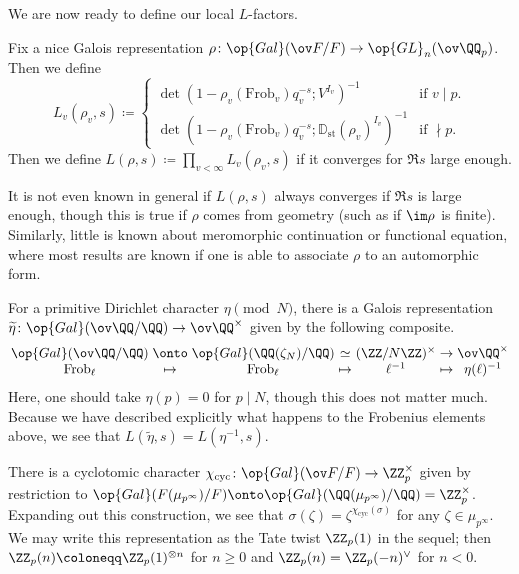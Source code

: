 \documentclass{article}
\begin{document}
We are now ready to define our local $L$-factors.
\begin{definition}
	Fix a nice Galois representation $\rho\colon\op{Gal}(\ov F/F)\to\op{GL}_n(\ov\QQ_p)$. Then we define
	\[L_v(\rho_v,s)\coloneqq\begin{cases}
		\det\left(1-\rho_v(\mathrm{Frob}_v)q_v^{-s};V^{I_v}\right)^{-1} & \text{if }v\mid p. \\
		\det\left(1-\rho_v(\mathrm{Frob}_v)q_v^{-s};\mathbb D_{\mathrm{st}}(\rho_v)^{I_v}\right)^{-1} & \text{if }\nmid p.
	\end{cases}\]
	Then we define $L(\rho,s)\coloneqq\prod_{v<\infty}L_v(\rho_v,s)$ if it converges for $\Re s$ large enough.
\end{definition}
\begin{remark}
	It is not even known in general if $L(\rho,s)$ always converges if $\Re s$ is large enough, though this is true if $\rho$ comes from geometry (such as if $\im\rho$ is finite). Similarly, little is known about meromorphic continuation or functional equation, where most results are known if one is able to associate $\rho$ to an automorphic form.
\end{remark}
\begin{example}
	For a primitive Dirichlet character $\eta\pmod N$, there is a Galois representation $\widetilde\eta\colon\op{Gal}(\ov\QQ/\QQ)\to\ov\QQ^\times$ given by the following composite.
	\[\arraycolsep=1.4pt\begin{array}{ccccccc}
		\op{Gal}(\ov\QQ/\QQ) &\onto& \op{Gal}(\QQ(\zeta_N)/\QQ) &\simeq& (\ZZ/N\ZZ)^\times &\to& \ov\QQ^\times \\
		\mathrm{Frob}_\ell &\mapsto& \mathrm{Frob}_\ell &\mapsto& \ell^{-1} &\mapsto& \eta(\ell)^{-1}
	\end{array}\]
	Here, one should take $\eta(p)=0$ for $p\mid N$, though this does not matter much. Because we have described explicitly what happens to the Frobenius elements above, we see that $L(\widetilde\eta,s)=L\left(\eta^{-1},s\right)$.
\end{example}
\begin{example}
	There is a cyclotomic character $\chi_{\mathrm{cyc}}\colon\op{Gal}(\ov F/F)\to\ZZ_p^\times$ given by restriction to $\op{Gal}(F(\mu_{p^\infty})/F)\onto\op{Gal}(\QQ(\mu_{p^\infty})/\QQ)=\ZZ_p^\times$. Expanding out this construction, we see that $\sigma(\zeta)=\zeta^{\chi_{\mathrm{cyc}}(\sigma)}$ for any $\zeta\in\mu_{p^\infty}$. We may write this representation as the Tate twist $\ZZ_p(1)$ in the sequel; then $\ZZ_p(n)\coloneqq\ZZ_p(1)^{\otimes n}$ for $n\ge0$ and $\ZZ_p(n)=\ZZ_p(-n)^\lor$ for $n<0$.
\end{example}
\end{document}

